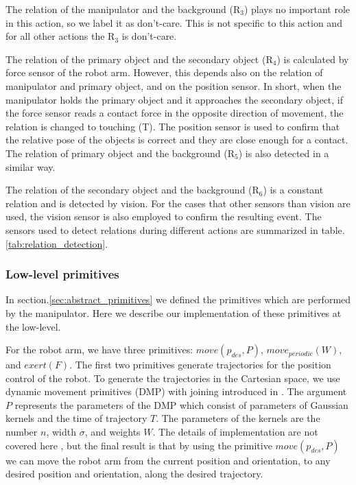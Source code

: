 The relation of the manipulator and the background ($\text{R}_3$) plays no important role in this action, so we label it as don't-care.
This is not specific to this action and for all other actions the $\text{R}_3$ is don't-care.


The relation of the primary object and the secondary object ($\text{R}_4$) is calculated by force sensor of the robot arm.
However, this depends also on the relation of manipulator and primary object, and on the position sensor.
In short, when the manipulator holds the primary object and it approaches the secondary object,
if the force sensor reads a contact force in the opposite direction of movement, the relation is changed to touching (T).
The position sensor is used to confirm that the relative pose of the objects is correct and they are close enough for a contact.
The relation of primary object and the background ($\text{R}_5$) is also detected in a similar way.

The relation of the secondary object and the background ($\text{R}_6$) is a constant relation and is detected by vision.
For the cases that other sensors than vision are used, the vision sensor is also employed to confirm the resulting event.
The sensors used to detect relations during different actions are summarized in table.\ref{tab:relation_detection}.


\subsubsection{Low-level primitives}
\label{section_primitives}
In section.\ref{sec:abstract_primitives} we defined the primitives which are performed by the manipulator.
Here we describe our implementation of these primitives at the low-level.

For the robot arm, we have three primitives: $move(p_{des},P)$, $move_{periodic}(W)$, and $exert(F)$.
The first two primitives generate trajectories for the position control of the robot.
To generate the trajectories in the Cartesian space, we use dynamic movement primitives (DMP) with joining introduced in \cite{Kulvicius2012}.
The argument $P$ represents the parameters of the DMP which consist of parameters of Gaussian kernels and the time of trajectory $T$.
The parameters of the kernels are the number $n$, width $\sigma$, and weights $W$.
The details of implementation are not covered here , but the final result is that by using the primitive $move(p_{des},P)$
we can move the robot arm from the current position and orientation, to any desired position and orientation, along the desired trajectory.

